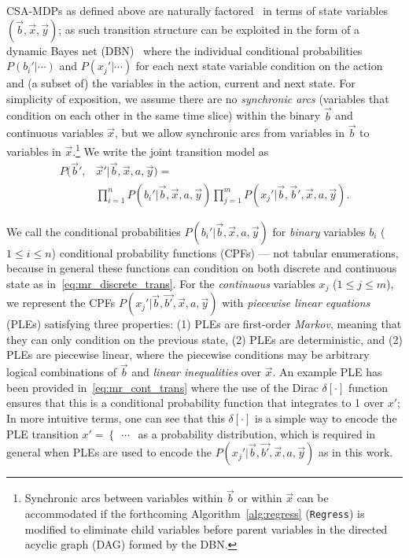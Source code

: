 CSA-MDPs as defined above are naturally factored~\cite{boutilier99dt}
in terms of state variables $(\vec{b},\vec{x},\vec{y})$; as such
transition structure can be exploited in the form of a dynamic Bayes
net (DBN)~\cite{dbn} where the individual conditional probabilities
$P(b_i'|\cdots)$ and $P(x_j'|\cdots)$ for each next state variable
condition on the action and (a subset of) the variables in the action,
current and next state.  For simplicity of exposition, we assume there
are no \emph{synchronic arcs} (variables that condition on each other
in the same time slice) within the binary $\vec{b}$ and continuous
variables $\vec{x}$, but we allow synchronic arcs from variables in
$\vec{b}$ to variables in $\vec{x}$.\footnote{Synchronic arcs between
variables within $\vec{b}$ or within $\vec{x}$ can be accommodated if
the forthcoming Algorithm~\ref{alg:regress} (\texttt{Regress}) 
is modified to
eliminate child variables before parent variables in the directed
acyclic graph (DAG) formed by the DBN.}  We write the joint transition
model as
\begin{align}
P(\vec{b}',&\vec{x}'|\vec{b},\vec{x},a,\vec{y}) = \label{eq:dbn} \\
& \prod_{i=1}^n P(b_i'|\vec{b},\vec{x},a,\vec{y}) \prod_{j=1}^m P(x_j'|\vec{b},\vec{b}',\vec{x},a,\vec{y}). \nonumber 
\end{align}


We call the conditional probabilities
$P(b_i'|\vec{b},\vec{x},a,\vec{y})$ for \emph{binary} variables $b_i$
($1 \leq i \leq n$) conditional probability functions (CPFs) --- not
tabular enumerations, because in general these functions can condition
on both discrete and continuous state as
in~\eqref{eq:mr_discrete_trans}.  For the \emph{continuous} variables
$x_j$ ($1 \leq j \leq m$), we represent the CPFs
$P(x_j'|\vec{b},\vec{b'},\vec{x},a,\vec{y})$ with \emph{piecewise
linear equations} (PLEs) satisfying three properties: (1) PLEs are
first-order \emph{Markov}, meaning that they can only condition on the
previous state, (2) PLEs are deterministic, and (2) PLEs are piecewise
linear, where the piecewise conditions may be arbitrary logical
combinations of $\vec{b}$ and \emph{linear inequalities} over $\vec{x}$.  An
example PLE has been provided in~\eqref{eq:mr_cont_trans} where the
use of the Dirac $\delta[\cdot]$ function ensures that this is a
conditional probability function that integrates to 1 over $x'$; In
more intuitive terms, one can see that this $\delta[\cdot]$ is a
simple way to encode the PLE transition $x' = \begin{cases} \ldots
\end{cases}$ as a probability distribution, which is required in
general when PLEs are used to encode the
$P(x_j'|\vec{b},\vec{b'},\vec{x},a,\vec{y})$ as in this work.

